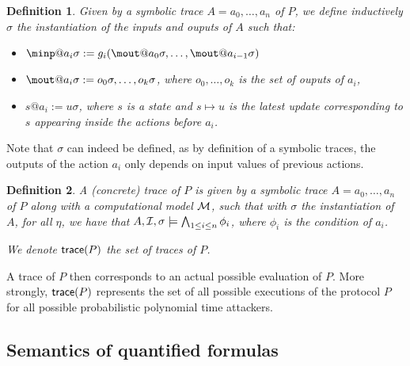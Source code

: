\documentclass[a4paper]{article}
\newtheorem{definition}{Definition}
\theoremstyle{remark}
\begin{document}
\begin{definition}
  Given by a symbolic trace $A = a_0,\dots,a_n$ of $P$, we define inductively $\sigma$ the instantiation of the inputs and ouputs of $A$ such that:
  \begin{itemize}
  \item $\minp@a_i\sigma := g_i( \mout@a_0\sigma,\dots,\mout@a_{i-1}\sigma  ) $
  \item $\mout@a_i\sigma := o_0\sigma, \dots, o_k\sigma$, where $o_0,\dots,o_k$ is the set of ouputs of  $a_i$,
    \item $s@a_i := u\sigma$, where $s$ is a state and $s \mapsto u$ is the latest update corresponding to $s$ appearing inside the actions before $a_i$.
\end{itemize}
\end{definition}
Note that $\sigma$ can indeed be defined, as by definition of a symbolic traces, the outputs of the action $a_i$ only depends on input values of previous actions.

\begin{definition}
  A (concrete) trace of $P$ is given by a symbolic trace $A = a_0,\dots,a_n$ of $P$ along with a computational model $\mathcal{M}$, such that with $\sigma$ the instantiation of $A$, for all $\eta$, we have that $A,\mathcal{I},\sigma \models \bigwedge_{1\leq i \leq n} \phi_i$, where $\phi_i$ is the condition of $a_i$.

  We denote $\textsf{trace}(P)$ the set of traces of $P$.
\end{definition}

A trace of $P$ then corresponds to an actual possible evaluation of $P$. More strongly, $\textsf{trace}(P)$ represents the set of all possible executions of the protocol $P$ for all possible probabilistic polynomial time attackers.

\subsection{Semantics of quantified formulas}
\end{document}
